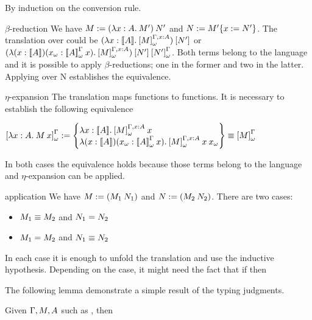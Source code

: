 \begin{Proof}
By induction on the conversion rule.
\begin{ProofCase}{$\beta$-reduction}
We have $\M{}\termDef\app{(\abs{x}{A}{M'})}{N'}$ and $N{}:=M{}'\{x:= N{}'\}$. The 
translation over \M{} could be \mbox{$\app{(\WParamTransPropAbs[x][A][M])}{\Trans{N'}}$} or 
\mbox{$\app{(\WParamTransNPropAbs[x][A][M])}{\Trans{N'}}{\WParamTrans{N'}}$}. 
Both terms belong to the language and it is possible to apply $\beta$-reductions; one in the former and 
two in the latter. Applying  over N establishes the equivalence.
\end{ProofCase}

\begin{ProofCase}{$\eta$-expansion}
The translation maps functions to functions. It is necessary to establish the following equivalence
\begin{center}
$\WParamTrans{\abs{x}{A}{\app{M}{x}}} \termDef \left \{
\begin{matrix*}[l]
    \app{\WParamTransPropAbs}{x} \\
    \app{\WParamTransNPropAbs}{x}{\WTermTrans{x}}
\end{matrix*} \right \} \equiv \WParamTrans{M}$    
\end{center}
In both cases the equivalence holds because those terms belong to the language and $\eta$-expansion 
can be applied.
\end{ProofCase}

\begin{ProofCase}{application}
We have $\M\termDef(\app{\M_1}{\N_1})$ and $\N\termDef(\app{\M_2}{\N_2})$. There are two cases:
\begin{itemize}
    \item $M_1\equiv M_2$ and $N_1=N_2$
    \item $M_1=M_2$ and $N_1\equiv N_2$
\end{itemize}
In each case it is enough to unfold the translation and use the inductive hypothesis. 
Depending on the case, it might need
the fact that if  then 
\end{ProofCase}
\end{Proof}

The following lemma demonstrate a simple result of the typing judgments.
\begin{Lemma}
Given $\Gamma,M,A$ such as , then \wfContext{\Context} 
\end{Lemma}


